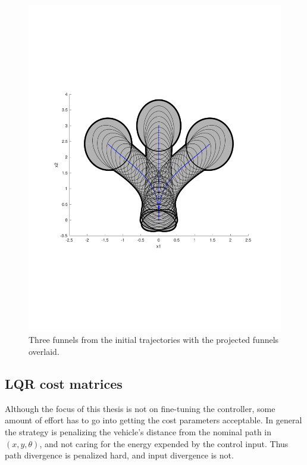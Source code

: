 \begin{figure}
  \centering
  \includegraphics[scale=.5]{figures/experiments/sample-funnel-overlay}
  \caption{Three funnels from the initial trajectories with the projected
    funnels overlaid.}
  \label{fig:sample-funnel-overlay}
\end{figure}

\subsection{LQR cost matrices}

Although the focus of this thesis is not on fine-tuning the controller, some
amount of effort has to go into getting the cost parameters acceptable. In
general the strategy is penalizing the vehicle's distance from the nominal path
in \((x,y,\theta)\), and not caring for the energy expended by the control
input. Thus path divergence is penalized hard, and input divergence is not.

